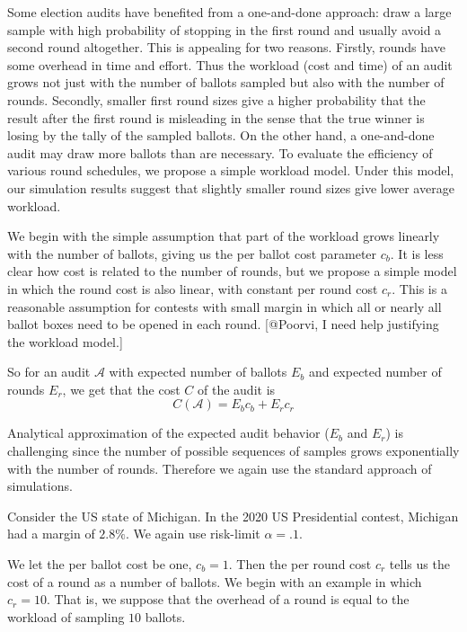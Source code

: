 Some election audits have benefited from a one-and-done approach: draw a large sample with high probability of stopping in the first round and usually avoid a second round altogether. This is appealing for two reasons. Firstly, rounds have some overhead in time and effort. Thus the workload (cost and time) of an audit grows not just with the number of ballots sampled but also with the number of rounds. Secondly, smaller first round sizes give a higher probability that the result after the first round is misleading in the sense that the true winner is losing by the tally of the sampled ballots. On the other hand, a one-and-done audit may draw more ballots than are necessary. To evaluate the efficiency of various round schedules, we propose a simple workload model. Under this model, our simulation results suggest that slightly smaller round sizes give lower average workload. 

We begin with the simple assumption that part of the workload grows linearly with the number of ballots, giving us the per ballot cost parameter $c_{b}$. It is less clear how cost is related to the number of rounds, but we propose a simple model in which the round cost is also linear, with constant per round cost $c_{r}$. This is a reasonable assumption for contests with small margin in which all or nearly all ballot boxes need to be opened in each round. [@Poorvi, I need help justifying the workload model.]

So for an audit $\mathcal{A}$ with expected number of ballots $E_{b}$ and expected number of rounds $E_{r}$, we get that the cost $C$ of the audit is
\begin{equation}
C(\mathcal{A}) = E_b c_b + E_r c_r
\label{eq:cost}
\end{equation}

Analytical approximation of the expected audit behavior ($E_b$ and $E_r$) is challenging since the number of possible sequences of samples grows exponentially with the number of rounds. 
Therefore we again use the standard approach of simulations.

Consider the US state of Michigan. In the 2020 US Presidential contest, Michigan had a margin of $2.8\%$. We again use risk-limit $\alpha = .1$. 

We let the per ballot cost be one, $c_b=1$. Then the per round cost $c_r$ tells us the cost of a round as a number of ballots. We begin with an example in which $c_r=10$. That is, we suppose that the overhead of a round is equal to the workload of sampling $10$ ballots.

